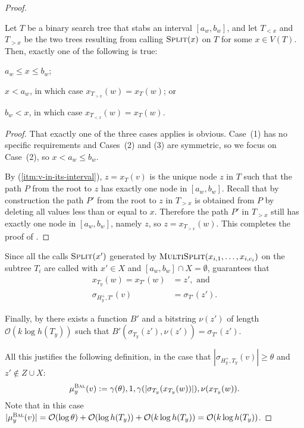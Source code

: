 \documentclass[kpfonts]{patmorin}
\newcommand{\Oh}{\mathcal{O}}
\let\le\leqslant
\let\geq\geqslant
\begin{document}
\begin{proof}
  \begin{clm}
    Let $T$ be a binary search tree that stabs an interval $[a_w,b_w]$, 
    and let $T_{<x}$ and $T_{>x}$ be the two trees resulting from calling $\textsc{Split}(x)$ on $T$ for some $x\in V(T)$. Then, exactly one of the following is true:
    \begin{compactenum}
      \item $a_w\le x\le b_w$;
      \item $x< a_w$, in which case $x_{T_{>x}}(w)=x_T(w)$; or
      \item $b_w < x$, in which case $x_{T_{<x}}(w)=x_T(w)$.
    \end{compactenum}
  \end{clm}
  \begin{proof}
    That exactly one of the three cases applies is obvious.  Case~(1) has no specific requirements and Cases~(2) and (3) are symmetric, so we focus on Case~(2), so $x < a_w\le b_w$.

    By (\ref{itm:v-in-its-interval}), $z=x_T(v)$ is the unique node $z$ in $T$ such that the path $P$ from the root to $z$ has exactly one node in $[a_w,b_w]$. 
    Recall that by construction 
    the path $P'$ from the root to $z$ in $T_{>x}$ is obtained from $P$ 
    by deleting all values less than or equal to $x$. 
    Therefore the path $P'$ in $T_{>x}$ still has exactly one node in $[a_w,b_w]$, namely $z$, 
    so $z=x_{T_{>x}}(w)$. This completes the proof of .
  \end{proof}

  Since all the calls $\textsc{Split}(x')$ generated by $\textsc{MultiSplit}(x_{i,1},\ldots,x_{i,c_i})$ on the subtree $T_{i}$ are called with $x'\in X$ and $[a_w,b_w]\cap X =\emptyset$,  guarantees that 
  \begin{align*}
  x_{T_y}(w) = x_{T'}(w) &= z', \textrm{ and}\\
  \sigma_{H^+_y,T'}(v) &= \sigma_{T'}(z').
  \end{align*}

  Finally, by  there exists a function $B'$ and a bitstring 
  $\nu(z')$ of length $\Oh(k\log h(T_y))$ such that 
  $B'(\sigma_{T_y}(z'), \nu(z')) = \sigma_{T'}(z')$. 

  All this justifies the following definition, in the case that $|\sigma_{H^+_{y},T_{y}}(v)| \geq \theta$ and $z'\not\in Z\cup X$:
  \[
   \mu_y^{\textsc{Bal}}(v) := \gamma(\theta),1,\gamma(|\sigma_{T_y}(x_{T_y}(w))|),\nu(x_{T_y}(w)).
  \]
  Note that in this case $|\mu_y^{\textsc{Bal}}(v)|=\Oh(\log\theta)+\Oh(\log h(T_y)) + \Oh(k\log h(T_y)) = \Oh(k\log h(T_y))$.


\end{proof}
\end{document}
